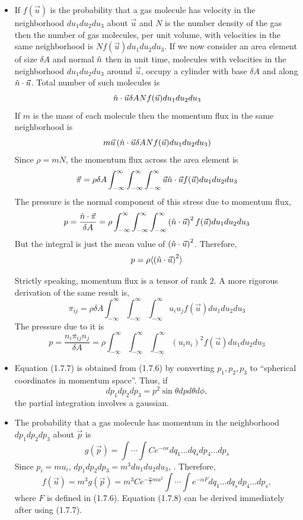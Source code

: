 \begin{itemize}
\item If $f(\vec{u})$ is the probability that a gas molecule has velocity in the neighborhood $du_1du_2du_3$ about $\vec{u}$ and $N$ is the number density of the gas then the number 
of gas molecules, per unit volume, with velocities in the same neighborhood is $Nf(\vec{u})du_1du_2du_3$. If we now consider an area element of size $\delta A$ and normal $\hat{n}$ then in 
unit time, molecules with velocities in the neighborhood $du_1du_2du_3$ around $\vec{u}$, occupy a cylinder with base $\delta A$ and along $\hat{n}\cdot\vec{u}$. Total number of such 
molecules is
\[
\hat{n}\cdot\vec{u}\delta{A}Nf(\vec{u})du_1du_2du_3
\]
If $m$ is the mass of each molecule then the momentum flux in the same neighborhood is
\[
m\vec{u}\left(\hat{n}\cdot\vec{u}\delta{A}Nf(\vec{u})du_1du_2du_3\right)
\]
Since $\rho = mN$, the momentum flux across the area element is
\[
\vec{\pi} = \rho\delta{A}\int_{-\infty}^{\infty}\int_{-\infty}^{\infty}\int_{-\infty}^{\infty}\vec{u}\hat{n}\cdot\vec{u}f(\vec{u})du_1du_2du_3
\]
The pressure is the normal component of this stress due to momentum flux,
\[
p = \frac{\hat{n}\cdot\vec{\pi}}{\delta{A}} = \rho\int_{-\infty}^{\infty}\int_{-\infty}^{\infty}\int_{-\infty}^{\infty}\left(\hat{n}\cdot\vec{u}\right)^2 f(\vec{u})du_1du_2du_3
\]
But the integral is just the mean value of $\left(\hat{n}\cdot\vec{u}\right)^2$. Therefore, 
\[
p = \rho\langle\left(\hat{n}\cdot\vec{u}\right)^2\rangle
\]
\begin{rem}
Strictly speaking, momentum flux is a tensor of rank $2$. A more rigorous derivation of the same result is,
\[
\pi_{ij} = \rho\delta{A}\int_{-\infty}^{\infty}\int_{-\infty}^{\infty}\int_{-\infty}^{\infty} u_i u_j f(\vec{u})du_1du_2du_3
\]
The pressure due to it is
\[
p = \frac{n_i \pi_{ij} n_j}{\delta{A}} = \rho\int_{-\infty}^{\infty}\int_{-\infty}^{\infty}\int_{-\infty}^{\infty}\left(u_i n_i\right)^2 f(\vec{u})du_1du_2du_3
\]
\end{rem}

\item Equation (1.7.7) is obtained from (1.7.6) by converting $p_1, p_2, p_3$ to \enquote{spherical coordinates in momentum space}. Thus, if 
\[
dp_1 dp_2 dp_3 = p^2\sin\theta dpd\theta d\phi,
\]
the partial integration involves a gaussian.

\item The probability that a gas molecule has momentum in the neighborhood $dp_1dp_2dp_3$ about $\vec{p}$ is 
\[
g(\vec{p}) = \int \cdots \int Ce^{-\alpha\epsilon} dq_1 \ldots dq_s dp_4 \ldots dp_s
\]
Since $p_i = mu_i$, $dp_1dp_2dp_3 = m^3du_1du_2du_3$, . Therefore,
\[
f(\vec{u}) = m^3g(\vec{p}) = m^3 C e^{-\frac{\alpha}{2}mu^2}\int \cdots \int e^{-\alpha F}dq_1 \ldots dq_s dp_4 \ldots dp_s,
\]
where $F$ is defined in (1.7.6). Equation (1.7.8) can be derived immediately after using (1.7.7).
\end{itemize}

